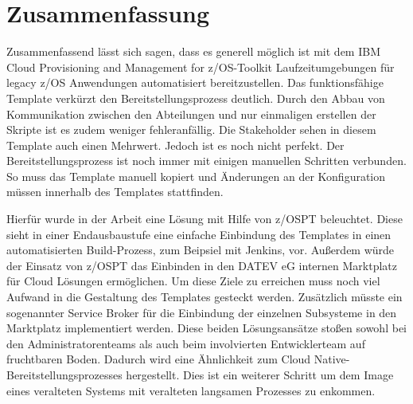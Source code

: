 \chapter{Zusammenfassung}\label{ch:zusammenfassung}
Zusammenfassend lässt sich sagen, dass es generell möglich ist mit dem \glqq IBM Cloud Provisioning and Management for z/OS\grqq-Toolkit Laufzeitumgebungen für legacy z/OS Anwendungen automatisiert bereitzustellen.
Das funktionsfähige Template verkürzt den Bereitstellungsprozess deutlich.
Durch den Abbau von Kommunikation zwischen den Abteilungen und nur einmaligen erstellen der Skripte ist es zudem weniger fehleranfällig.
Die Stakeholder sehen in diesem Template auch einen Mehrwert.
Jedoch ist es noch nicht perfekt.
Der Bereitstellungsprozess ist noch immer mit einigen manuellen Schritten verbunden.
So muss das Template manuell kopiert und Änderungen an der Konfiguration müssen innerhalb des Templates stattfinden.

Hierfür wurde in der Arbeit eine Lösung mit Hilfe von z/OSPT beleuchtet.
Diese sieht in einer Endausbaustufe eine einfache Einbindung des Templates in einen automatisierten Build-Prozess, zum Beipsiel mit Jenkins, vor.
Außerdem würde der Einsatz von z/OSPT das Einbinden in den DATEV eG internen \glqq Marktplatz\grqq{} für Cloud Lösungen ermöglichen.
Um diese Ziele zu erreichen muss noch viel Aufwand in die Gestaltung des Templates gesteckt werden.
Zusätzlich müsste ein sogenannter \glqq Service Broker\grqq{} für die Einbindung der einzelnen Subsysteme in den \glqq Marktplatz\grqq{} implementiert werden.
Diese beiden Lösungsansätze stoßen sowohl bei den Administratorenteams als auch beim involvierten Entwicklerteam auf fruchtbaren Boden.
Dadurch wird eine Ähnlichkeit zum Cloud Native-Bereitstellungsprozesses hergestellt.
Dies ist ein weiterer Schritt um dem Image eines veralteten Systems mit veralteten langsamen Prozesses zu enkommen.  
